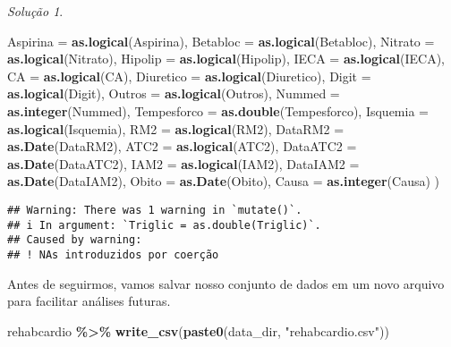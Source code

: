 \documentclass[
]{latex/krantz}
\newenvironment{Shaded}{\begin{snugshade}}{\end{snugshade}}
\newcommand{\AttributeTok}[1]{\textcolor[rgb]{0.13,0.29,0.53}{#1}}
\newcommand{\FunctionTok}[1]{\textcolor[rgb]{0.13,0.29,0.53}{\textbf{#1}}}
\newcommand{\NormalTok}[1]{#1}
\newcommand{\SpecialCharTok}[1]{\textcolor[rgb]{0.81,0.36,0.00}{\textbf{#1}}}
\newcommand{\StringTok}[1]{\textcolor[rgb]{0.31,0.60,0.02}{#1}}
\theoremstyle{definition}
\theoremstyle{definition}
\theoremstyle{definition}
\theoremstyle{definition}
\theoremstyle{remark}
\newtheorem*{solution}{Solução}
\begin{document}
\begin{solution}
\begin{Shaded}
\begin{Highlighting}[]
                    \AttributeTok{Aspirina =} \FunctionTok{as.logical}\NormalTok{(Aspirina),}
                    \AttributeTok{Betabloc =} \FunctionTok{as.logical}\NormalTok{(Betabloc),}
                    \AttributeTok{Nitrato =} \FunctionTok{as.logical}\NormalTok{(Nitrato),}
                    \AttributeTok{Hipolip =} \FunctionTok{as.logical}\NormalTok{(Hipolip),}
                    \AttributeTok{IECA =} \FunctionTok{as.logical}\NormalTok{(IECA),}
                    \AttributeTok{CA =} \FunctionTok{as.logical}\NormalTok{(CA),}
                    \AttributeTok{Diuretico =} \FunctionTok{as.logical}\NormalTok{(Diuretico),}
                    \AttributeTok{Digit =} \FunctionTok{as.logical}\NormalTok{(Digit),}
                    \AttributeTok{Outros =} \FunctionTok{as.logical}\NormalTok{(Outros),}
                    \AttributeTok{Nummed =} \FunctionTok{as.integer}\NormalTok{(Nummed),}
                    \AttributeTok{Tempesforco =} \FunctionTok{as.double}\NormalTok{(Tempesforco),}
                    \AttributeTok{Isquemia =} \FunctionTok{as.logical}\NormalTok{(Isquemia),}
                    \AttributeTok{RM2 =} \FunctionTok{as.logical}\NormalTok{(RM2),}
                    \AttributeTok{DataRM2 =} \FunctionTok{as.Date}\NormalTok{(DataRM2),}
                    \AttributeTok{ATC2 =} \FunctionTok{as.logical}\NormalTok{(ATC2),}
                    \AttributeTok{DataATC2 =} \FunctionTok{as.Date}\NormalTok{(DataATC2),}
                    \AttributeTok{IAM2 =} \FunctionTok{as.logical}\NormalTok{(IAM2),}
                    \AttributeTok{DataIAM2 =} \FunctionTok{as.Date}\NormalTok{(DataIAM2),}
                    \AttributeTok{Obito =} \FunctionTok{as.Date}\NormalTok{(Obito),}
                    \AttributeTok{Causa =} \FunctionTok{as.integer}\NormalTok{(Causa)}
\NormalTok{                )}
\end{Highlighting}
\end{Shaded}

\begin{verbatim}
## Warning: There was 1 warning in `mutate()`.
## i In argument: `Triglic = as.double(Triglic)`.
## Caused by warning:
## ! NAs introduzidos por coerção
\end{verbatim}

Antes de seguirmos, vamos salvar nosso conjunto de dados em um novo arquivo para facilitar análises futuras.

\begin{Shaded}
\begin{Highlighting}[]
\NormalTok{rehabcardio }\SpecialCharTok{\%\textgreater{}\%}
  \FunctionTok{write\_csv}\NormalTok{(}\FunctionTok{paste0}\NormalTok{(data\_dir, }\StringTok{"rehabcardio.csv"}\NormalTok{))}
\end{Highlighting}
\end{Shaded}


\end{solution}
\end{document}
